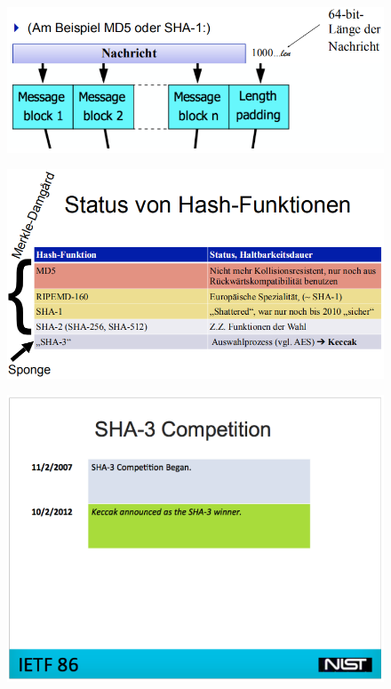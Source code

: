 \documentclass[openany]{book}
\begin{document}
\begin{figure}[h!]
    \centering
    \includegraphics[width=\linewidth]{Pics/Padding2.PNG}
\end{figure} 

\newpage

\begin{figure}[h!]
    \centering
    \includegraphics[width=\linewidth]{Pics/Hashing4.PNG}
\end{figure} 

\begin{figure}[h!]
    \centering
    \includegraphics[width=\linewidth]{Pics/Hashing5.PNG}
\end{figure} 
\end{document}
